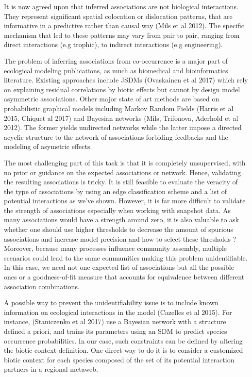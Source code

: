 \documentclass[]{article}
\begin{document}
It is now agreed upon that inferred associations are not biological interactions. They represent significant spatial colocation or dislocation patterns, that are informative in a predictive rather than causal way (Mils et al 2012). The specific mechanism that led to these patterns may vary from pair to pair, ranging from direct interactions (e.g trophic), to indirect interactions (e.g engineering). 

The problem of inferring associations from co-occurrence is a major part of ecological modeling publications, as much as biomedical and bioinformatics literature. Existing approaches include JSDMs (Ovaskainen et al 2017) which rely on explaining residual correlations by biotic effects but cannot by design model asymmetric associations. Other major state of art methods are based on probabilistic graphical models including Markov Random Fields (Harris et al 2015, Chiquet al 2017) and Bayesian networks (Mils, Trifonova, Aderhold et al 2012). The former yields undirected networks while the latter impose a directed acyclic structure to the network of associations forbiding feedbacks and the modeling of asymetric effects. 

The most challenging part of this task is that it is completely unsupervised, with no prior or guidance on the expected associations or network. Hence, validating the resulting associations is tricky. It is still feasible to evaluate the veracity of the type of associations by using an edge classification scheme and a list of potential interactions as we've shown. However, it is far more difficult to validate the strength of associations especially when working with snapshot data. As many associations would have a strength around zero, it is also valuable to ask whether one should use higher thresholds to decrease the amount of spurious associations and increase model precision and how to select these thresholds ? Moreover, because many processes influence community assembly, multiple scenarios could lead to the same communities making this problem unidentifiable. In this case, we need not one expected list of associations but all the possible ones or a goodness-of-fit measure that accounts for equivalence between different association combinations. 

A possible way to prevent the unidentifiability issue is to include known information on ecological interactions in the model (Cazelles et al 2015). For instance, (Staniczenko et al 2017) use a Bayesian network with a structure defined a priori, and trains its parameters using an SDM to predict species occurrence probabilities. In our case, such constraints can be defined by altering the biotic context definition. One direct way to do it is to consider a customized biotic context for each species composed of the set of its potential interaction partners in a regional metaweb. 
\end{document}
